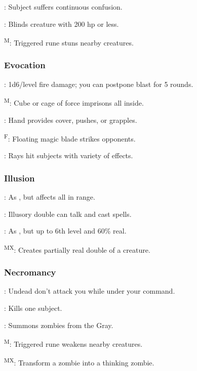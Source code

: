 	: Subject suffers continuous confusion.

	: Blinds creature with 200 hp or less.

	\textsuperscript{M}: Triggered rune stuns nearby creatures.

\subsubsection{Evocation}
	: 1d6/level fire damage; you can postpone blast for 5 rounds.

	\textsuperscript{M}: Cube or cage of force imprisons all inside.

	: Hand provides cover, pushes, or grapples.

	\textsuperscript{F}: Floating magic blade strikes opponents.

	: Rays hit subjects with variety of effects.

\subsubsection{Illusion}
	: As , but affects all in range.

	: Illusory double can talk and cast spells.

	: As , but up to 6th level and 60\% real.

	\textsuperscript{MX}: Creates partially real double of a creature.

\subsubsection{Necromancy}
	: Undead don't attack you while under your command.
	
	: Kills one subject.
	
	: Summons zombies from the Gray. %

	\textsuperscript{M}: Triggered rune weakens nearby creatures.

	\textsuperscript{MX}: Transform a zombie into a thinking 
	zombie. %
	
